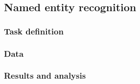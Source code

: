 

\subsection{Named entity recognition}


\subsubsection{Task definition}


\subsubsection{Data}


\subsubsection{Results and analysis}


\pagebreak
